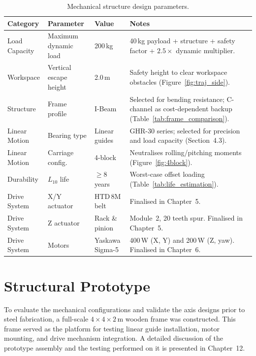 \begin{table}[H]
    \centering
    \caption{Mechanical structure design parameters.}
    \label{tab:design_parameters}
    \small
    \renewcommand{\arraystretch}{1.2}
    \begin{tabularx}{\textwidth}{@{} p{2.1cm} p{2.4cm} p{2.2cm} X @{}}
        \toprule
        \textbf{Category} & \textbf{Parameter} & \textbf{Value} & \textbf{Notes} \\
        \midrule
        Load Capacity & Maximum dynamic load & 200\,kg & 40\,kg payload + structure + safety factor + $2.5\times$ dynamic multiplier. \\
        \addlinespace
        Workspace & Vertical escape height & 2.0\,m & Safety height to clear workspace obstacles (Figure~\ref{fig:traj_side}). \\
        \addlinespace
        Structure & Frame profile & I-Beam & Selected for bending resistance; C-channel as cost-dependent backup (Table~\ref{tab:frame_comparison}). \\
        \addlinespace
        Linear Motion & Bearing type & Linear guides & GHR-30 series; selected for precision and load capacity (Section~4.3). \\
        \addlinespace
        Linear Motion & Carriage config. & 4-block & Neutralises rolling/pitching moments (Figure~\ref{fig:4block}). \\
        \addlinespace
        Durability & $L_{10}$ life & $\geq 8$ years & Worst-case offset loading (Table~\ref{tab:life_estimation}). \\
        \addlinespace
        Drive System & X/Y actuator & HTD\,8M belt & Finalised in Chapter~5. \\
        \addlinespace
        Drive System & Z actuator & Rack \& pinion & Module~2, 20 teeth spur. Finalised in Chapter~5. \\
        \addlinespace
        Drive System & Motors & Yaskawa Sigma-5 & 400\,W (X, Y) and 200\,W (Z, yaw). Finalised in Chapter~6. \\
        \bottomrule
    \end{tabularx}
\end{table}

\section{Structural Prototype}

To evaluate the mechanical configurations and validate the axis designs prior to steel fabrication, a full-scale $4 \times 4 \times 2$\,m wooden frame was constructed. This frame served as the platform for testing linear guide installation, motor mounting, and drive mechanism integration. A detailed discussion of the prototype assembly and the testing performed on it is presented in Chapter~12.

